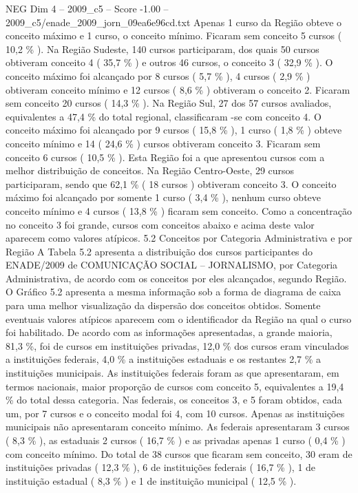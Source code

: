\begin{textsample}{NEG Dim 4 – 2009\_c5 – Score -1.00 – 2009\_c5/enade\_2009\_jorn\_09ea6e96cd.txt}
Apenas 1 curso da Região obteve o conceito máximo e 1 curso, o conceito mínimo.
Ficaram sem conceito 5 cursos ( 10,2 \% ).
Na Região Sudeste, 140 cursos participaram, dos quais 50 cursos obtiveram conceito 4 ( 35,7 \% ) e outros 46 cursos, o conceito 3 ( 32,9 \% ).
O conceito máximo foi alcançado por 8 cursos ( 5,7 \% ), 4 cursos ( 2,9 \% ) obtiveram conceito mínimo e 12 cursos ( 8,6 \% ) obtiveram o conceito 2.
Ficaram sem conceito 20 cursos ( 14,3 \% ).
Na Região Sul, 27 dos 57 cursos avaliados, equivalentes a 47,4 \% do total regional, classificaram -se com conceito 4.
O conceito máximo foi alcançado por 9 cursos ( 15,8 \% ), 1 curso ( 1,8 \% ) obteve conceito mínimo e 14 ( 24,6 \% ) cursos obtiveram conceito 3.
Ficaram sem conceito 6 cursos ( 10,5 \% ).
Esta Região foi a que apresentou cursos com a melhor distribuição de conceitos.
Na Região Centro-Oeste, 29 cursos participaram, sendo que 62,1 \% ( 18 cursos ) obtiveram conceito 3.
O conceito máximo foi alcançado por somente 1 curso ( 3,4 \% ), nenhum curso obteve conceito mínimo e 4 cursos ( 13,8 \% ) ficaram sem conceito.
Como a concentração no conceito 3 foi grande, cursos com conceitos abaixo e acima deste valor aparecem como valores atípicos. 5.2 Conceitos por Categoria Administrativa e por Região A Tabela 5.2 apresenta a distribuição dos cursos participantes do ENADE/2009 de COMUNICAÇÃO SOCIAL – JORNALISMO, por Categoria Administrativa, de acordo com os conceitos por eles alcançados, segundo Região.
O Gráfico 5.2 apresenta a mesma informação sob a forma de diagrama de caixa para uma melhor visualização da dispersão dos conceitos obtidos.
Somente eventuais valores atípicos aparecem com o identificador da Região na qual o curso foi habilitado.
De acordo com as informações apresentadas, a grande maioria, 81,3 \%, foi de cursos em instituições privadas, 12,0 \% dos cursos eram vinculados a instituições federais, 4,0 \% a instituições estaduais e os restantes 2,7 \% a instituições municipais.
As instituições federais foram as que apresentaram, em termos nacionais, maior proporção de cursos com conceito 5, equivalentes a 19,4 \% do total dessa categoria.
Nas federais, os conceitos 3, e 5 foram obtidos, cada um, por 7 cursos e o conceito modal foi 4, com 10 cursos.
Apenas as instituições municipais não apresentaram conceito mínimo.
As federais apresentaram 3 cursos ( 8,3 \% ), as estaduais 2 cursos ( 16,7 \% ) e as privadas apenas 1 curso ( 0,4 \% ) com conceito mínimo.
Do total de 38 cursos que ficaram sem conceito, 30 eram de instituições privadas ( 12,3 \% ), 6 de instituições federais ( 16,7 \% ), 1 de instituição estadual ( 8,3 \% ) e 1 de instituição municipal ( 12,5 \% ).

\end{textsample}
